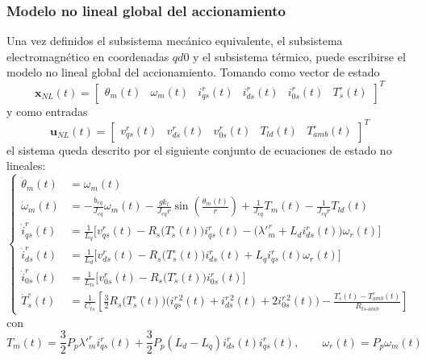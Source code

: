 \documentclass[12pt, a4paper,journal, onecolumn, compsoc]{IEEEtran}
\begin{document}
    \subsubsection{Modelo no lineal global del accionamiento}
    Una vez definidos el subsistema mecánico equivalente, el subsistema electromagnético en coordenadas \(qd0\) y el subsistema térmico, puede escribirse el modelo no lineal global del accionamiento. Tomando como vector de estado
    \[
        \mathbf{x}_{NL}(t)=\begin{bmatrix}
            \theta_m(t) & \omega_m(t) & i_{qs}^r(t) & i_{ds}^r(t) & i_{0s}^r(t) & T_s^\circ(t)
        \end{bmatrix}^T
    \]
    y como entradas
    \[
        \mathbf{u}_{NL}(t)=\begin{bmatrix}
            v_{qs}^r(t) & v_{ds}^r(t) & v_{0s}^r(t) & T_{ld}(t) & T_{amb}^\circ(t)
        \end{bmatrix}^T
    \]
    el sistema queda descrito por el siguiente conjunto de ecuaciones de estado no lineales:
    \begin{equation}
    \left\{
        \begin{aligned}
            \dot{\theta}_m(t) &= \omega_m(t) \\[6pt]
            \dot{\omega}_m(t) &= -\frac{b_{eq}}{J_{eq}}\omega_m(t)-\frac{gk_l}{J_{eq}r}\sin\left(\frac{\theta_m(t)}{r}\right)+\frac{1}{J_{eq}}T_m(t)-\frac{1}{J_{eq}r}T_{ld}(t) \\[6pt]
            \dot{i}_{qs}^r(t) &= \frac{1}{L_q}\Big[v_{qs}^r(t)-R_s\big(T_s^\circ(t)\big)i_{qs}^r(t)-\big(\lambda'^r_m+L_d i_{ds}^r(t)\big)\omega_r(t)\Big] \\[6pt]
            \dot{i}_{ds}^r(t) &= \frac{1}{L_d}\Big[v_{ds}^r(t)-R_s\big(T_s^\circ(t)\big)i_{ds}^r(t)+L_q i_{qs}^r(t)\omega_r(t)\Big] \\[6pt]
            \dot{i}_{0s}^r(t) &= \frac{1}{L_{ls}}\Big[v_{0s}^r(t)-R_s\big(T_s^\circ(t)\big)i_{0s}^r(t)\Big] \\[6pt]
            \dot{T}_s^\circ(t) &= \frac{1}{C_{ts}}\left[\frac{3}{2}R_s\big(T_s^\circ(t)\big)\Big(i_{qs}^{r\,2}(t)+i_{ds}^{r\,2}(t)+2i_{0s}^{r\,2}(t)\Big)-\frac{T_s^\circ(t)-T_{amb}^\circ(t)}{R_{ts\text{-}amb}}\right]
        \end{aligned}
    \right.
    \end{equation}
    con
    \begin{equation}
        T_m(t)=\frac{3}{2} P_p \lambda'^r_m i_{qs}^r(t)+\frac{3}{2}P_p(L_d-L_q)i_{ds}^r(t)i_{qs}^r(t),
        \qquad
        \omega_r(t)=P_p\omega_m(t)
    \end{equation}
\end{document}
